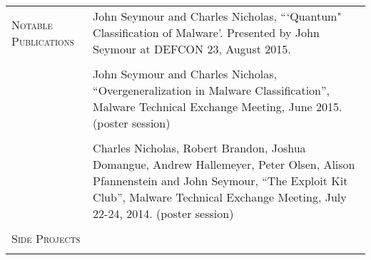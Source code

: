 \begin{tabular}{l p{340pt}}
\textsc{Notable Publications}
& John Seymour and Charles Nicholas, ```Quantum" Classification of Malware'. Presented by John Seymour at DEFCON 23, August 2015.\\ \\
& John Seymour and Charles Nicholas, ``Overgeneralization in Malware Classification'', Malware Technical Exchange Meeting, June 2015. (poster session)\\ \\
& Charles Nicholas, Robert Brandon, Joshua Domangue, Andrew Hallemeyer, Peter Olsen, Alison Pfannenstein and John Seymour, ``The Exploit Kit Club'', Malware Technical Exchange Meeting, July 22-24, 2014.  (poster session)\\ \\

\textsc{Side Projects} & \\
& \\


\end{tabular}
